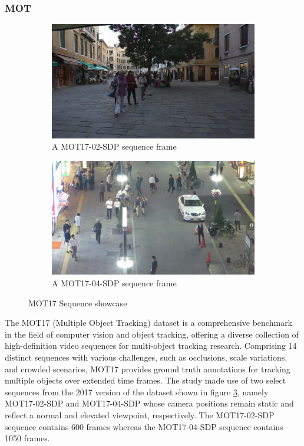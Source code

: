 \subsubsection{MOT}
\begin{figure}[!htbp]
\centering
\begin{subfigure}{.5\textwidth}
  \centering
  \includegraphics[width=0.9\linewidth]{images/MOT-02.png}
  \caption{A MOT17-02-SDP sequence frame}
  \label{fig:sub1}
\end{subfigure}%
\begin{subfigure}{.5\textwidth}
  \centering
  \includegraphics[width=0.9\linewidth]{images/MOT-04.png}
  \caption{A MOT17-04-SDP sequence frame}
  \label{fig:sub2}
\end{subfigure}
\caption{MOT17 Sequence showcase}
\label{fig:mot}
\end{figure}
The MOT17 (Multiple Object Tracking) dataset is a comprehensive benchmark in the field of computer vision and object tracking, offering a diverse collection of high-definition video sequences for multi-object tracking research. Comprising 14 distinct sequences with various challenges, such as occlusions, scale variations, and crowded scenarios, MOT17 provides ground truth annotations for tracking multiple objects over extended time frames. The study made use of two select sequences from the 2017 version of the dataset shown in figure \ref{fig:mot}, namely MOT17-02-SDP and MOT17-04-SDP whose camera positions remain static and reflect a normal and elevated viewpoint, respectively. The MOT17-02-SDP sequence contains 600 frames whereas the MOT17-04-SDP sequence contains 1050 frames.